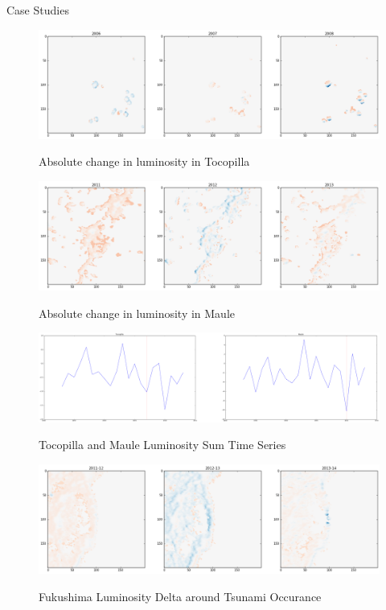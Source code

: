 \documentclass{beamer}
\begin{document}
\begin{section}{Case Studies}
  \begin{frame}
    \begin{figure}
      \centering
      \includegraphics[width=.7\linewidth]{tocopilla_series}\label{fig:tocopilla_series}
      \caption{Absolute change in luminosity in Tocopilla}
      \includegraphics[width=.7\linewidth]{maule_series}\label{fig:maule_series}
      \caption{Absolute change in luminosity in Maule}
    \end{figure}
  \end{frame}

  \begin{frame}
        \begin{figure}
          \centering
          \includegraphics[width=1\linewidth]{maule_tocopilla}\label{fig:maule_tocopilla}
          \caption{Tocopilla and Maule Luminosity Sum Time Series}
        \end{figure}
  \end{frame}

  \begin{frame}
        \begin{figure}
          \centering
          \includegraphics[width=1\linewidth]{fukushima}\label{fig:fukushima}
          \caption{Fukushima Luminosity Delta around Tsunami Occurance}
        \end{figure}
  \end{frame}
\end{section}
\end{document}
